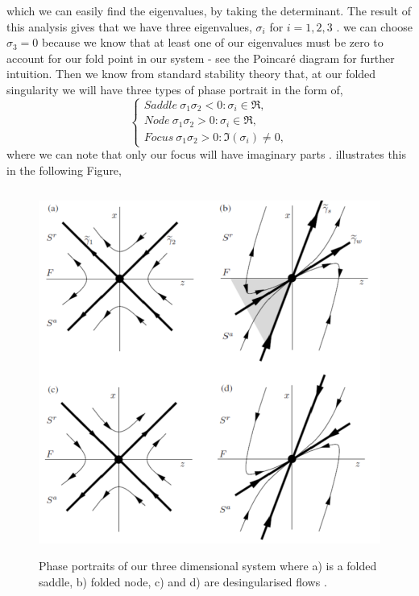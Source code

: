 which we can easily find the eigenvalues, by taking the determinant. The result of this analysis gives that we have three eigenvalues, $ \sigma_i $ for $ i=1,2,3 $ \citep{MMO}. \Wlg we can choose $ \sigma_3=0 $ because we know that at least one of our eigenvalues must be zero to account for our fold point in our system - see the Poincar\'e diagram for further intuition. Then we know from standard stability theory that, at our folded singularity we will have three types of phase portrait in the form of,
\begin{equation}
\begin{cases}
Saddle \ \sigma_1\sigma_2<0: \sigma_i\in\Re,\\
Node \ \sigma_1\sigma_2>0: \sigma_i\in\Re,\\
Focus \ \sigma_1\sigma_2>0: \Im(\sigma_i)\neq 0,
\end{cases}
\end{equation}
where we can note that only our focus will have imaginary parts \citep{MMO}. \citet{MMO} illustrates this in the following Figure, 
\begin{figure}[h!]\centering
	\includegraphics[height=12cm,width=12cm]{Images/foldednodesetc}
	\caption{Phase portraits of our three dimensional system where a) is a folded saddle, b) folded node, c) and d) are desingularised flows \citep{MMO}.}
	\label{fig: folded singularities}
\end{figure}\newpage%
